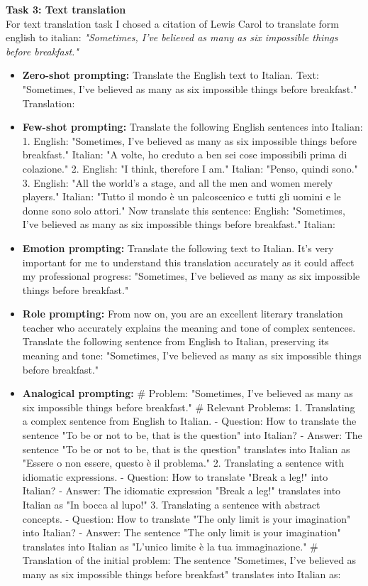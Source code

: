 \textbf{Task 3: Text translation}\\
For text translation task I chosed a citation of Lewis Carol \cite{carol} to translate form english to italian: \textit{"Sometimes, I've believed as many as six impossible things before breakfast."}
\begin{itemize}
    \item \textbf{Zero-shot prompting:} Translate the English text to Italian. Text: "Sometimes, I've believed as many as six impossible things before breakfast." Translation:
    \item \textbf{Few-shot prompting:} Translate the following English sentences into Italian: 
    1. English: "Sometimes, I've believed as many as six impossible things before breakfast." Italian: "A volte, ho creduto a ben sei cose impossibili prima di colazione." 
    2. English: "I think, therefore I am." Italian: "Penso, quindi sono." 
    3. English: "All the world's a stage, and all the men and women merely players." Italian: "Tutto il mondo è un palcoscenico e tutti gli uomini e le donne sono solo attori." 
    Now translate this sentence: English: "Sometimes, I've believed as many as six impossible things before breakfast." Italian:
    \item \textbf{Emotion prompting:} Translate the following text to Italian. It's very important for me to understand this translation accurately as it could affect my professional progress: "Sometimes, I've believed as many as six impossible things before breakfast."
    \item \textbf{Role prompting:} From now on, you are an excellent literary translation teacher who accurately explains the meaning and tone of complex sentences. Translate the following sentence from English to Italian, preserving its meaning and tone: "Sometimes, I've believed as many as six impossible things before breakfast."
    \item \textbf{Analogical prompting:} \# Problem: "Sometimes, I've believed as many as six impossible things before breakfast." 
    \# Relevant Problems: 
    1. Translating a complex sentence from English to Italian. 
    - Question: How to translate the sentence "To be or not to be, that is the question" into Italian? 
    - Answer: The sentence "To be or not to be, that is the question" translates into Italian as "Essere o non essere, questo è il problema." 
    2. Translating a sentence with idiomatic expressions. 
    - Question: How to translate "Break a leg!" into Italian? 
    - Answer: The idiomatic expression "Break a leg!" translates into Italian as "In bocca al lupo!" 
    3. Translating a sentence with abstract concepts. 
    - Question: How to translate "The only limit is your imagination" into Italian? 
    - Answer: The sentence "The only limit is your imagination" translates into Italian as "L'unico limite è la tua immaginazione." 
    \# Translation of the initial problem: The sentence "Sometimes, I've believed as many as six impossible things before breakfast" translates into Italian as:
\end{itemize}
